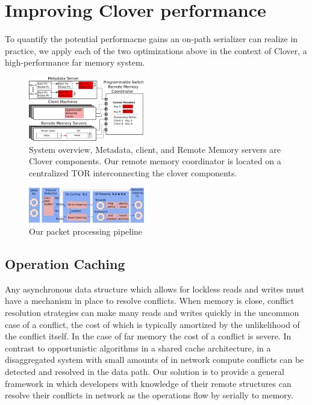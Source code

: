 \section{Improving Clover performance}

To quantify the potential performacne gains an on-path serializer can
realize in practice, we apply each of the two optimizations above in
the context of Clover, a high-performance far memory system.


\begin{figure}
    \includegraphics[width=0.45\textwidth]{fig/overview.pdf}
    \caption{ System overview, Metadata, client, and Remote Memory
    servers are Clover components. Our remote memory coordinator is
    located on a centralized TOR interconnecting the clover components.
    }
    \label{fig:overview} 
\end{figure}

\begin{figure}
    \includegraphics[width=0.45\textwidth]{fig/packet_processing.pdf}
    \caption{Our packet processing pipeline}
    \label{fig:system}
\end{figure}


\subsection{Operation Caching}
\label{sec:operation-caching}

Any asynchronous data structure which allows for lockless reads and writes must
have a mechanism in place to resolve conflicts. When memory is close, conflict
resolution strategies can make many reads and writes quickly in the uncommon
case of a conflict, the cost of which is typically amortized by the unlikelihood
of the conflict itself. In the case of far memory the cost of a conflict is
severe. In contrast to opportunistic algorithms in a shared cache architecture,
in a disaggregated system with small amounts of in network compute conflicts can
be detected and resolved in the data path. Our solution is to provide a general
framework in which developers with knowledge of their remote structures can
resolve their conflicts in network as the operations flow by serially to memory. 

